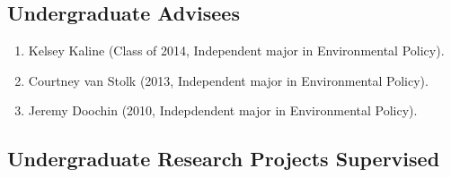 \documentclass[10pt]{article}
\begin{document}
    \subsection{Undergraduate Advisees}
    \begin{enumerate}
    \item Kelsey Kaline (Class of 2014, Independent major in Environmental Policy).
    \item Courtney van Stolk (2013, Independent major in Environmental Policy).
    \item Jeremy Doochin (2010, Indepdendent major in Environmental Policy).
    \end{enumerate}
    \subsection{Undergraduate Research Projects Supervised}
\end{document}
